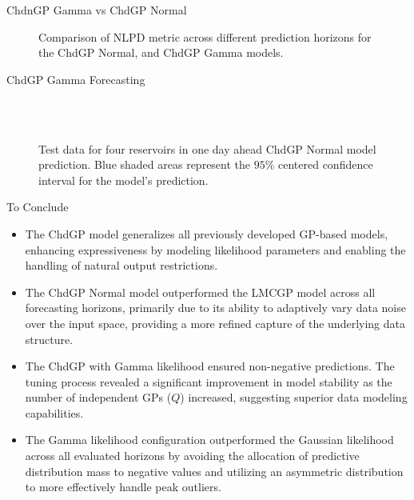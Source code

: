 \begin{frame}{ChdnGP Gamma vs ChdGP Normal}
	\begin{figure}[htbp]
		\centering
		\setlength\figurewidth{\columnwidth} 
		\setlength{}
		
		\caption{Comparison of NLPD metric across different prediction horizons for the ChdGP Normal, and ChdGP Gamma models.}
	\end{figure}
	
\end{frame}

\begin{frame}{ChdGP Gamma Forecasting}
	\centering
	\begin{figure}[htbp]
		\tiny
		\setlength{} 
		\setlength{}
		
		\subfloat[$T.$]{}\hfill
		\subfloat[$A.$]{}\\[-0.5cm]
		\subfloat[$I.$]{}\hfill
		\subfloat[$O.$]{}\\[-0.4cm]
		
		\caption{Test data for four reservoirs in one day ahead ChdGP Normal model prediction. Blue shaded areas represent the $95\%$ centered confidence interval for the model's prediction.}
	\end{figure}
\end{frame}

\begin{frame}{To Conclude}
	
	\begin{itemize}
		\justifying
		\item The ChdGP model generalizes all previously developed GP-based models, enhancing expressiveness by modeling likelihood parameters and enabling the handling of natural output restrictions.
		
		\item The ChdGP Normal model outperformed the LMCGP model across all forecasting horizons, primarily due to its ability to adaptively vary data noise over the input space, providing a more refined capture of the underlying data structure.
		
		\item The ChdGP with Gamma likelihood ensured non-negative predictions. The tuning process revealed a significant improvement in model stability as the number of independent GPs ($Q$) increased, suggesting superior data modeling capabilities.
		
		\item The Gamma likelihood configuration outperformed the Gaussian likelihood across all evaluated horizons by avoiding the allocation of predictive distribution mass to negative values and utilizing an asymmetric distribution to more effectively handle peak outliers.
		
	\end{itemize}
\end{frame}


